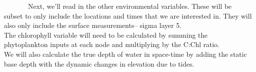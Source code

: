 \documentclass[
]{article}
\begin{document}
~~~~~~~Next, we'll read in the other environmental variables. These will
be subset to only include the locations and times that we are interested
in. They will also only include the surface measurements-- sigma layer
5.\\
\hspace*{0.333em}\hspace*{0.333em}\hspace*{0.333em}\hspace*{0.333em}\hspace*{0.333em}\hspace*{0.333em}\hspace*{0.333em}The
chlorophyll variable will need to be calculated by summing the
phytoplankton inputs at each node and multiplying by the C:Chl ratio.\\
\hspace*{0.333em}\hspace*{0.333em}\hspace*{0.333em}\hspace*{0.333em}\hspace*{0.333em}\hspace*{0.333em}\hspace*{0.333em}We
will also calculate the true depth of water in space-time by adding the
static base depth with the dynamic changes in elevation due to tides.

\singlespacing
\end{document}
